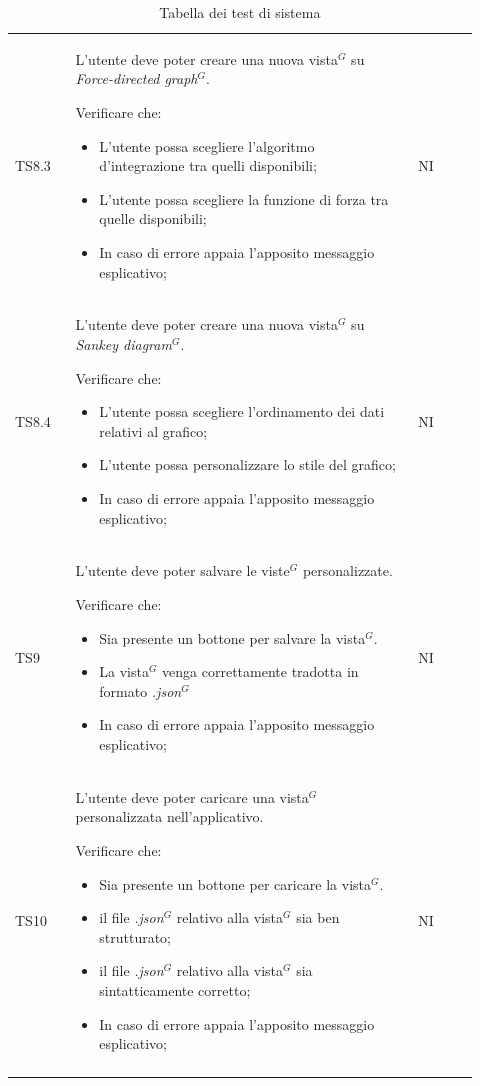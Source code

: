 \begin{longtable}{p{0.12\linewidth}p{0.68\linewidth}p{0.12\linewidth}}
    \rowcolor[RGB]{233, 245, 206}
    TS8.3 &
    L'utente deve poter creare una nuova vista$^{G}$ su \textit{Force-directed graph}$^{G}$. \par
    Verificare che:
    \begin{itemize}
        \item L'utente possa scegliere l'algoritmo d'integrazione tra quelli disponibili;
        \item L'utente possa scegliere la funzione di forza tra quelle disponibili;
        \item In caso di errore appaia l’apposito messaggio esplicativo;
    \end{itemize}&
    NI \\

    \rowcolor[RGB]{216, 235, 171}
    TS8.4 &
    L'utente deve poter creare una nuova vista$^{G}$ su \textit{Sankey diagram}$^{G}$. \par
    Verificare che:
    \begin{itemize}
        \item L'utente possa scegliere l'ordinamento dei dati relativi al grafico;
        \item L'utente possa personalizzare lo stile del grafico;
        \item In caso di errore appaia l'apposito messaggio esplicativo;
    \end{itemize}&
    NI \\

    \rowcolor[RGB]{233, 245, 206}
    TS9 &
    L'utente deve poter salvare le viste$^{G}$ personalizzate. \par
    Verificare che:
    \begin{itemize}
        \item Sia presente un bottone per salvare la vista$^{G}$.
        \item La vista$^{G}$ venga correttamente tradotta in formato \textit{.json}$^{G}$
        \item In caso di errore appaia l'apposito messaggio esplicativo;
    \end{itemize}&
    NI \\

    \rowcolor[RGB]{216, 235, 171}
    TS10 &
    L'utente deve poter caricare una vista$^{G}$ personalizzata nell'applicativo. \par
    Verificare che:
    \begin{itemize}
        \item Sia presente un bottone per caricare la vista$^{G}$.
        \item il file \textit{.json}$^{G}$ relativo alla vista$^{G}$ sia ben strutturato;
        \item il file \textit{.json}$^{G}$ relativo alla vista$^{G}$ sia sintatticamente corretto;
        \item In caso di errore appaia l'apposito messaggio esplicativo;
    \end{itemize}&
    NI \\
    
    \caption{Tabella dei test di sistema}
\end{longtable}	 

